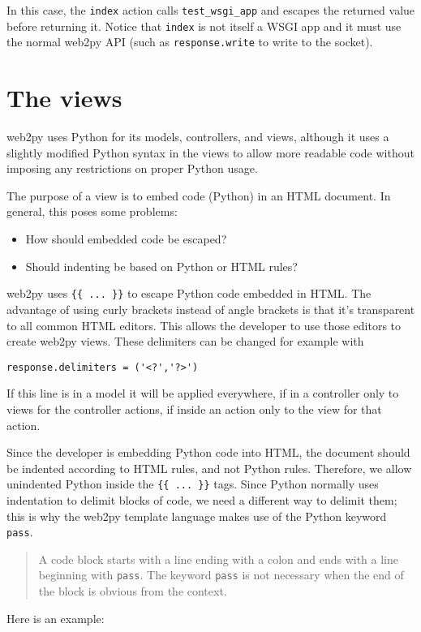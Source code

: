 \documentclass[justified,sixbynine,notoc]{tufte-book}
\def\ft{\small\tt}
\def\inxx#1{\index{#1}}
\begin{document}
\begin{fullwidth}
In this case, the {\ft index} action calls {\ft test\_wsgi\_app} and escapes the returned value before returning it. Notice that {\ft index} is not itself a WSGI app and it must use the normal web2py API (such as {\ft response.write} to write to the socket).

\goodbreak\chapter{The views}

\inxx{views} \inxx{template language} \inxx{HTML}
\noindent web2py uses Python for its models, controllers, and views, although it uses a slightly modified Python syntax in the views to allow more readable code without imposing any restrictions on proper Python usage.

The purpose of a view is to embed code (Python) in an HTML document. In general, this poses some problems:
\begin{itemize}
\item How should embedded code be escaped?

\item Should indenting be based on Python or HTML rules?
\end{itemize}
\noindent web2py uses {\ft \{\{ ... \}\}} to escape Python code embedded in HTML. The advantage of using curly brackets instead of angle brackets is that it's transparent to all common HTML editors. This allows the developer to use those editors to create web2py views. These delimiters can be changed for example with

\begin{lstlisting}
response.delimiters = ('<?','?>')
\end{lstlisting}

If this line is in a model it will be applied everywhere, if in a controller only to views for the controller actions, if inside an action only to the view for that action.

Since the developer is embedding Python code into HTML, the document should be indented according to HTML rules, and not Python rules. Therefore, we allow unindented Python inside the {\ft \{\{ ... \}\}} tags. Since Python normally uses indentation to delimit blocks of code, we need a different way to delimit them; this is why the web2py template language makes use of the Python keyword {\ft pass}.

\begin{quote}A code block starts with a line ending with a colon and ends with a line beginning with {\ft pass}. The keyword {\ft pass} is not necessary when the end of the block is obvious from the context.\end{quote}
Here is an example:


\end{fullwidth}
\end{document}
